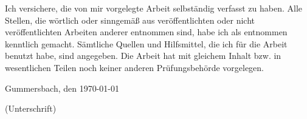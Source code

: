 \documentclass[12pt,oneside,a4paper,bibtotoc,liststotoc]{scrreprt}
\begin{document}
Ich versichere, die von mir vorgelegte Arbeit selbständig verfasst zu
haben. Alle Stellen, die wörtlich oder sinngemäß aus veröffentlichten
oder nicht veröffentlichten Arbeiten anderer entnommen sind, habe ich
als entnommen kenntlich gemacht. Sämtliche Quellen und Hilfsmittel,
die ich für die Arbeit benutzt habe, sind angegeben. Die Arbeit hat
mit gleichem Inhalt bzw. in wesentlichen Teilen noch keiner anderen
Prüfungsbehörde vorgelegen.

\bigskip

Gummersbach, den \today

\bigskip

\bigskip

\bigskip

\bigskip

\bigskip

\bigskip

(Unterschrift)
\end{document}
